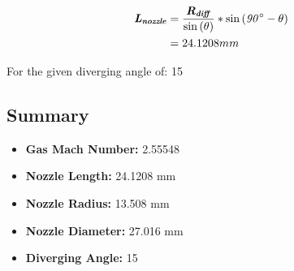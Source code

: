 \documentclass[12pt]{report}
\begin{document}
\vspace{6 mm}

\begin{equation}
\begin{split}
\boldsymbol{\mathit{L_{nozzle}}} & = \frac{\boldsymbol{\mathit{R_{diff}}}}{\sin{\left(\mathit{\theta}\right)}} * \sin{\left(\mathit{90\degree} - \mathit{\theta}\right)}\\
 & = 24.1208 mm 
\end{split}
\end{equation}


\vspace{6 mm}

For the given diverging angle of: 15 \degree

 

\vspace{10 mm}



\subsection{Summary}

\begin{itemize}
	\item \textbf{Gas Mach Number: } 2.55548 
	\item \textbf{Nozzle Length: } 24.1208 mm  
	\item \textbf{Nozzle Radius: } 13.508 mm  
	\item \textbf{Nozzle Diameter: } 27.016 mm  
	\item \textbf{Diverging Angle: } 15 \degree 
\end{itemize}
\end{document}

